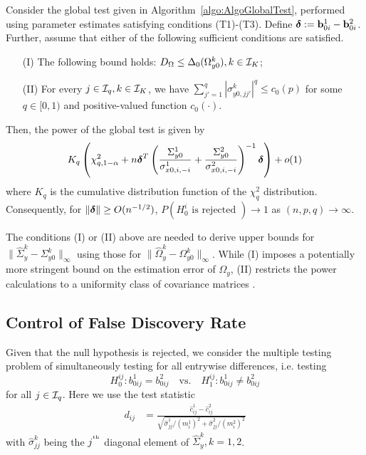 \begin{Theorem}\label{thm:PowerThm}
Consider the global test given in Algorithm~\ref{algo:AlgoGlobalTest}, performed using parameter estimates satisfying conditions (T1)-(T3). Define ${\boldsymbol{\delta}} := {\bf{b}}_{0 i}^1 - {\bf{b}}_{0 i}^2$. Further, assume that either of the following sufficient conditions are satisfied.

\begin{itemize}
\item[(I)] The following bound holds: $D_\Omega \leq \Delta_0 (\Omega_{y0}^k), k \in {\cal{I}}_K$;

\item[(II)] For every $j \in {\cal{I}}_q, k \in {\cal{I}}_K$, we have
$
\sum_{j' = 1}^q | \sigma_{y0,jj'}^k |^q \leq c_0 (p)
$ for some $q \in [0,1)$ and positive-valued function $c_0(\cdot)$.
\end{itemize}

Then, the power of the global test is given by
%
$$
K_q \left( \chi^2_{q,1-\alpha} + n {\boldsymbol{\delta}}^T 
\left( \frac{ \Sigma_{y 0}^1}{\sigma_{x0, i,-i}^1} + \frac{\Sigma_{y 0}^2}{\sigma_{x0, i,-i}^2} \right)^{-1} {\boldsymbol{\delta}} \right) + o(1)
$$
%
where $K_q$ is the cumulative distribution function of the $\chi^2_q$ distribution. Consequently, for $\| {\boldsymbol{\delta}} \| \geq O(n^{-1/2})$, $P( H_0^i \text{ is rejected }) \rightarrow 1$ as $(n,p,q) \rightarrow \infty$.
\end{Theorem}

The conditions (I) or (II) above are needed to derive upper bounds for $\| \widehat \Sigma_y^k - \Sigma_{y0}^k \|_\infty$ using those for $\| \widehat \Omega_y^k - \Omega_{y0}^k \|_\infty$. While (I) imposes a potentially more stringent bound on the estimation error of $\Omega_y$, (II) restricts the power calculations to a uniformity class of covariance matrices \citep{BickelLevina08,CaiLiuLuo12}.
%

\subsection{Control of False Discovery Rate}
Given that the null hypothesis is rejected, we consider the multiple testing problem of simultaneously testing for all entrywise differences, i.e. testing
%
$$
H_0^{ij}: b_{0 ij}^1 = b_{0ij}^2 \quad \text{vs.} \quad H_1^{ij}: b_{0 ij}^1 \neq b_{0 ij}^2 
$$
%
for all $j \in {\cal{I}}_q$. Here we use the test statistic
%
\begin{align}\label{eqn:PairwiseStatistic}
d_{ij} &= \frac{\widehat c_{ij}^1 - \widehat c_{ij}^2}{\sqrt{\hat \sigma_{jj}^1/ (m_i^1)^2 + \hat \sigma_{jj}^2/ (m_i^2)^2}}
\end{align}
%
with $\hat \sigma_{jj}^k$ being the $j^{\operatorname*{^{\text{th}}}}$ diagonal element of $\widehat \Sigma_y^k, k = 1,2$.

